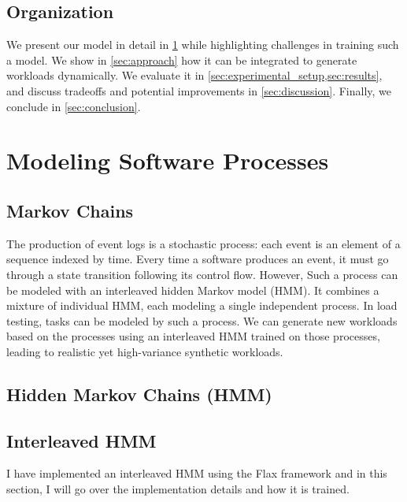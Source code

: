 \subsection{Organization}

We present our model in detail in \cref{sec:modeling_processes} while highlighting challenges in training such a model. We show in \cref{sec:approach} how it can be integrated to generate workloads dynamically. We evaluate it in \cref{sec:experimental_setup,sec:results}, and discuss tradeoffs and potential improvements in \cref{sec:discussion}. Finally, we conclude in \cref{sec:conclusion}.

\section{Modeling Software Processes}\label{sec:modeling_processes}

\subsection{Markov Chains}

The production of event logs is a stochastic process: each event is an element of a sequence indexed by time. Every time a software produces an event, it must go through a state transition following its control flow. However, Such a process can be modeled with an interleaved hidden Markov model (HMM). It combines a mixture of individual HMM, each modeling a single independent process. In load testing, tasks can be modeled by such a process. We can generate new workloads based on the processes using an interleaved HMM trained on those processes, leading to realistic yet high-variance synthetic workloads.

\subsection{Hidden Markov Chains (HMM)}

\subsection{Interleaved HMM}

I have implemented an interleaved HMM using the Flax\cite{Heek2023-nl} framework and in this section, I will go over the implementation details and how it is trained.

